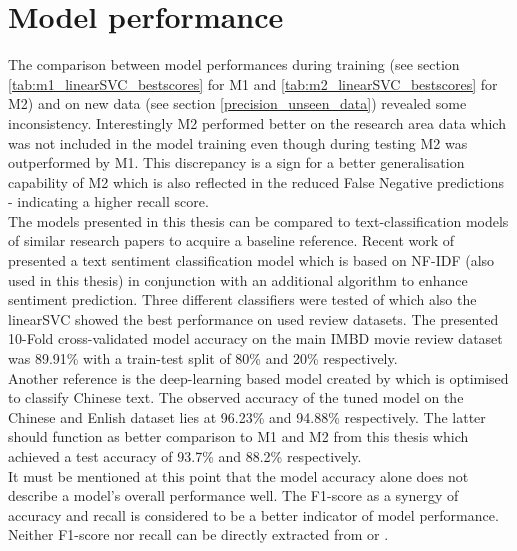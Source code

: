 \section{Model performance}
The comparison between model performances during training (see section \ref{tab:m1_linearSVC_bestscores} for M1 and \ref{tab:m2_linearSVC_bestscores} for M2) and on new data (see section \ref{precision_unseen_data}) revealed some inconsistency. Interestingly M2 performed better on the research area data which was not included in the model training even though during testing M2 was outperformed by M1. This discrepancy is a sign for a better generalisation capability of M2 which is also reflected in the reduced False Negative predictions - indicating a higher recall score.\\
\newline
The models presented in this thesis can be compared to text-classification models of similar research papers to acquire a baseline reference. Recent work of \parencite{Das2018} presented a text sentiment classification model which is based on NF-IDF (also used in this thesis) in conjunction with an additional algorithm to enhance sentiment prediction. Three different classifiers were tested of which also the linearSVC showed the best performance on used review datasets. The presented 10-Fold cross-validated model accuracy on the main IMBD movie review dataset was 89.91\% with a train-test split of 80\% and 20\% respectively.\\
Another reference is the deep-learning based model created by \parencite{Li2018} which is optimised to classify Chinese text. The observed accuracy of the tuned model on the Chinese and Enlish dataset lies at 96.23\% and 94.88\% respectively. The latter should function as better comparison to M1 and M2 from this thesis which achieved a test accuracy of 93.7\% and 88.2\% respectively.\\
It must be mentioned at this point that the model accuracy alone does not describe a model's overall performance well. The F1-score as a synergy of accuracy and recall is considered to be a better indicator of model performance. Neither F1-score nor recall can be directly extracted from \parencite{Das2018} or \parencite{Li2018}.\\